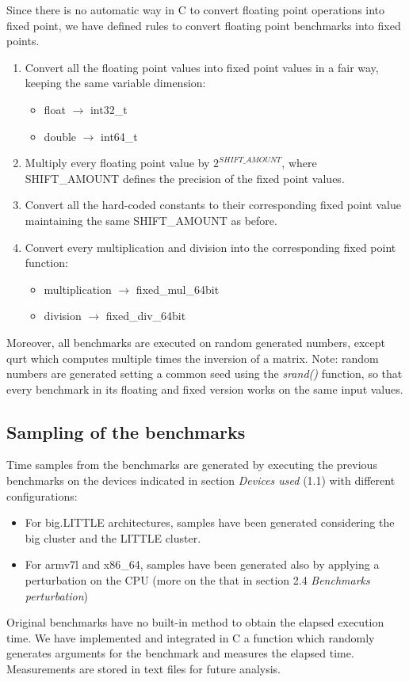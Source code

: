 Since there is no automatic way in C to convert floating point operations into fixed point, we have defined rules to convert floating point benchmarks into fixed points.
\begin{enumerate}
	\item Convert all the floating point values into fixed point values in a fair way, keeping the same variable dimension:
	\begin{itemize}
		\item float $\rightarrow$ int32\_t	
		\item double $\rightarrow$ int64\_t
	\end{itemize}
	\item Multiply every floating point value by ${2}^{SHIFT\_AMOUNT}$, where SHIFT\_AMOUNT defines the precision of the fixed point values.
	\item Convert all the hard-coded constants to their corresponding fixed point value maintaining the same SHIFT\_AMOUNT as before.
	\item Convert every multiplication and division into the corresponding fixed point function:
	\begin{itemize}
		\item multiplication $\rightarrow$ fixed\_mul\_64bit	
		\item division $\rightarrow$ fixed\_div\_64bit
	\end{itemize}
\end{enumerate}

Moreover, all benchmarks are executed on random generated numbers, except qurt which computes multiple times the inversion of a matrix.\newline
Note: random numbers are generated setting a common seed using the \textit{srand()} function, so that every benchmark in its floating and fixed version works on the same input values.
\subsection{Sampling of the benchmarks}

Time samples from the benchmarks are generated by executing the previous benchmarks on the devices indicated in section \textit{Devices used} (1.1) with different configurations:
\begin{itemize}
	\item For big.LITTLE architectures, samples have been generated considering the big cluster and the LITTLE cluster.
	\item For armv7l and x86\_64, samples have been generated also by applying a perturbation on the CPU (more on the that in section 2.4 \textit{Benchmarks perturbation})
\end{itemize}
Original benchmarks have no built-in method to obtain the elapsed execution time. We have implemented and integrated in C a function which randomly generates arguments for the benchmark and measures the elapsed time.
Measurements are stored in text files for future analysis.

